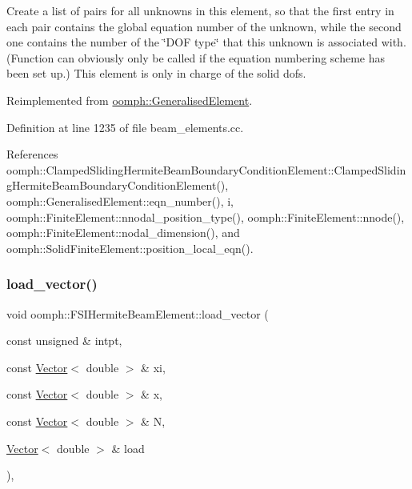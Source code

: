 Create a list of pairs for all unknowns in this element, so that the first entry in each pair contains the global equation number of the unknown, while the second one contains the number of the \char`\"{}\+D\+O\+F type\char`\"{} that this unknown is associated with. (Function can obviously only be called if the equation numbering scheme has been set up.) This element is only in charge of the solid dofs. 

Reimplemented from \hyperlink{classoomph_1_1GeneralisedElement_a069f59bfc3e607a5bebba52c6314d777}{oomph\+::\+Generalised\+Element}.



Definition at line 1235 of file beam\+\_\+elements.\+cc.



References oomph\+::\+Clamped\+Sliding\+Hermite\+Beam\+Boundary\+Condition\+Element\+::\+Clamped\+Sliding\+Hermite\+Beam\+Boundary\+Condition\+Element(), oomph\+::\+Generalised\+Element\+::eqn\+\_\+number(), i, oomph\+::\+Finite\+Element\+::nnodal\+\_\+position\+\_\+type(), oomph\+::\+Finite\+Element\+::nnode(), oomph\+::\+Finite\+Element\+::nodal\+\_\+dimension(), and oomph\+::\+Solid\+Finite\+Element\+::position\+\_\+local\+\_\+eqn().

\mbox{\label{classoomph_1_1FSIHermiteBeamElement_aee4b8fcdef1a2247389bab8807d5db8e}} 
\subsubsection{\texorpdfstring{load\+\_\+vector()}{load\_vector()}}
{\footnotesize\ttfamily void oomph\+::\+F\+S\+I\+Hermite\+Beam\+Element\+::load\+\_\+vector (\begin{DoxyParamCaption}\item[{const unsigned \&}]{intpt,  }\item[{const \hyperlink{classoomph_1_1Vector}{Vector}$<$ double $>$ \&}]{xi,  }\item[{const \hyperlink{classoomph_1_1Vector}{Vector}$<$ double $>$ \&}]{x,  }\item[{const \hyperlink{classoomph_1_1Vector}{Vector}$<$ double $>$ \&}]{N,  }\item[{\hyperlink{classoomph_1_1Vector}{Vector}$<$ double $>$ \&}]{load }\end{DoxyParamCaption})\hspace{0.3cm}{\ttfamily [inline]}, {\ttfamily [virtual]}}



